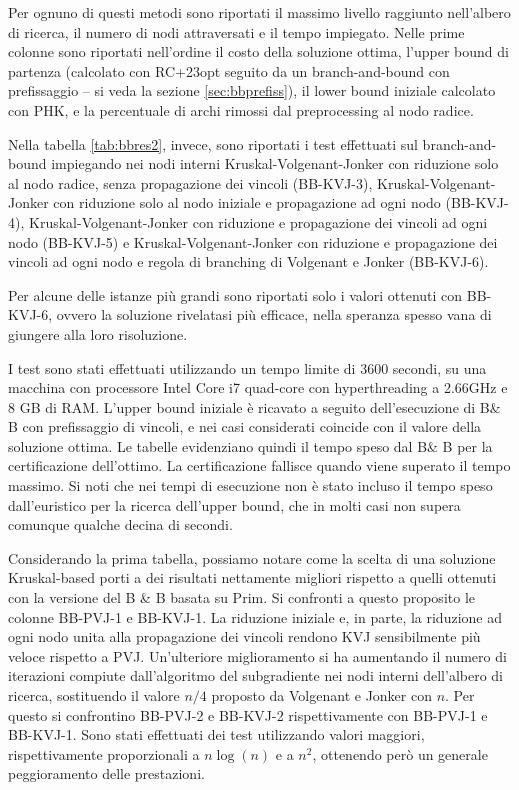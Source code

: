 Per ognuno di questi metodi sono riportati il massimo livello raggiunto nell'albero di ricerca, il numero di nodi attraversati e il tempo impiegato. Nelle prime colonne sono riportati nell'ordine il costo della soluzione ottima, l'upper bound di partenza (calcolato con RC+23opt seguito da un branch-and-bound con prefissaggio -- si veda la sezione \ref{sec:bbprefiss}), il lower bound iniziale calcolato con PHK, e la percentuale di archi rimossi dal preprocessing al nodo radice.

Nella tabella \ref{tab:bbres2}, invece, sono riportati i test effettuati sul branch-and-bound impiegando nei nodi interni Kruskal-Volgenant-Jonker con riduzione solo al nodo radice, senza propagazione dei vincoli (BB-KVJ-3), Kruskal-Volgenant-Jonker con riduzione solo al nodo iniziale e propagazione ad ogni nodo (BB-KVJ-4), Kruskal-Volgenant-Jonker con riduzione e propagazione dei vincoli ad ogni nodo (BB-KVJ-5) e Kruskal-Volgenant-Jonker con riduzione e propagazione dei vincoli ad ogni nodo e regola di branching di Volgenant e Jonker (BB-KVJ-6).

Per alcune delle istanze più grandi sono riportati solo i valori ottenuti con BB-KVJ-6, ovvero la soluzione rivelatasi più efficace, nella speranza spesso vana di giungere alla loro risoluzione.

I test sono stati effettuati utilizzando un tempo limite di 3600 secondi, su una macchina con processore Intel Core i7 quad-core con hyperthreading a 2.66GHz e 8 GB di RAM. L'upper bound iniziale è ricavato a seguito dell'esecuzione di B\& B con prefissaggio di vincoli, e nei casi considerati coincide con il valore della soluzione ottima. Le tabelle evidenziano quindi il tempo speso dal B\& B per la certificazione dell'ottimo. La certificazione fallisce quando viene superato il tempo massimo. Si noti che nei tempi di esecuzione non è stato incluso il tempo speso dall'euristico per la ricerca dell'upper bound, che in molti casi non supera comunque qualche decina di secondi. 

Considerando la prima tabella, possiamo notare come la scelta di una soluzione Kruskal-based porti a dei risultati nettamente migliori rispetto a quelli ottenuti con la versione del B \& B basata su Prim. Si confronti a questo proposito le colonne BB-PVJ-1 e BB-KVJ-1. La riduzione iniziale e, in parte, la riduzione ad ogni nodo unita alla propagazione dei vincoli rendono KVJ sensibilmente più veloce rispetto a PVJ. Un'ulteriore miglioramento si ha aumentando il numero di iterazioni compiute dall'algoritmo del subgradiente nei nodi interni dell'albero di ricerca, sostituendo il valore $n/4$ proposto da Volgenant e Jonker con $n$. Per questo si confrontino BB-PVJ-2 e BB-KVJ-2 rispettivamente con BB-PVJ-1 e BB-KVJ-1. Sono stati effettuati dei test utilizzando valori maggiori, rispettivamente proporzionali a $n \log(n)$ e a $n^2$, ottenendo però un generale peggioramento delle prestazioni.

